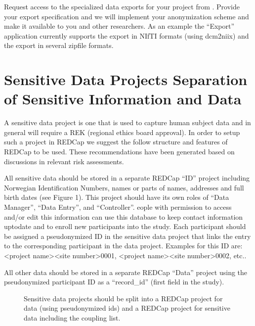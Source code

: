 \documentclass[letterpaper,10pt,english]{sphinxmanual}
\begin{document}
\sphinxAtStartPar
Request access to the specialized data exports for your project from . Provide your export specification and we will implement your anonymization scheme and make it available to you and other researchers. As an example the “Export” application currently supports the export in NIfTI formats (using dcm2niix) and the export in several zip\sphinxhyphen{}file formats.


\section{Sensitive Data Projects \textendash{} Separation of Sensitive Information and Data}
\label{\detokenize{ServerAdmin/index:sensitive-data-projects-separation-of-sensitive-information-and-data}}
\sphinxAtStartPar
A sensitive data project is one that is used to capture human subject data and in general will require a REK (regional ethics board approval). In order to setup such a project in REDCap we suggest the follow structure and features of REDCap to be used. These recommendations have been generated based on discussions in relevant risk assessments.

\sphinxAtStartPar
All sensitive data should be stored in a separate REDCap “ID” project including Norwegian Identification Numbers, names or parts of names, addresses and full birth dates (see Figure 1). This project should have its own roles of “Data Manager”, “Data Entry”, and “Controller”.  eople with permission to access and/or edit this information can use this database to keep contact information up\sphinxhyphen{}to\sphinxhyphen{}date and to enroll new participants into the study. Each participant should be assigned a pseudonymized ID in the sensitive data project that links the entry to the corresponding participant in the data project. Examples for this ID are: \textless{}project name\textgreater{}\sphinxhyphen{}\textless{}site number\textgreater{}\sphinxhyphen{}0001, \textless{}project name\textgreater{}\sphinxhyphen{}\textless{}site number\textgreater{}\sphinxhyphen{}0002, etc..

\sphinxAtStartPar
All other data should be stored in a separate REDCap “Data” project using the pseudonymized participant ID as a “record\_id” (first field in the study).

\begin{figure}[htbp]
\centering
\capstart

\noindent{}
\caption{Sensitive data projects should be split into a REDCap project for data (using pseudonymized ids) and a REDCap project for sensitive data including the coupling list.}\label{\detokenize{ServerAdmin/index:id1}}\end{figure}
\end{document}
